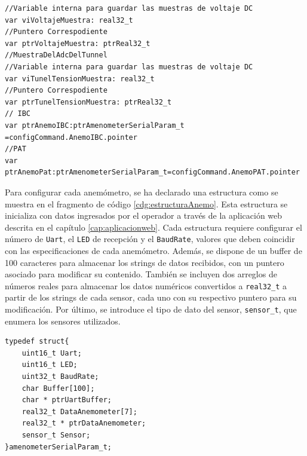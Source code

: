 \begin{lstlisting}[style=yakindustyle, caption={Variables para almacenar en cada iteración una muestra de su magnitud correspondiente.}, label=cdg:var_const_Adquisition]
//Variable interna para guardar las muestras de voltaje DC
var viVoltajeMuestra: real32_t
//Puntero Correspodiente
var ptrVoltajeMuestra: ptrReal32_t
//MuestraDelAdcDelTunnel
//Variable interna para guardar las muestras de voltaje DC
var viTunelTensionMuestra: real32_t
//Puntero Correspodiente
var ptrTunelTensionMuestra: ptrReal32_t
// IBC
var ptrAnemoIBC:ptrAmenometerSerialParam_t =configCommand.AnemoIBC.pointer
//PAT
var ptrAnemoPat:ptrAmenometerSerialParam_t=configCommand.AnemoPAT.pointer

\end{lstlisting}


Para configurar cada anemómetro, se ha declarado una estructura como se muestra en el fragmento de código \ref{cdg:estructuraAnemo}. Esta estructura se inicializa con datos ingresados por el operador a través de la aplicación web descrita en el capítulo \ref{cap:aplicacionweb}. Cada estructura requiere configurar el número de \texttt{Uart}, el \texttt{LED} de recepción y el \texttt{BaudRate}, valores que deben coincidir con las especificaciones de cada anemómetro. Además, se dispone de un buffer de 100 caracteres para almacenar los strings de datos recibidos, con un puntero asociado para modificar su contenido. También se incluyen dos arreglos de números reales para almacenar los datos numéricos convertidos a \texttt{real32\_t} a partir de los strings de cada sensor, cada uno con su respectivo puntero para su modificación. Por último, se introduce el tipo de dato del sensor, \texttt{sensor\_t}, que enumera los sensores utilizados.



% 
\begin{lstlisting}[style=cstyle, caption={Estructura de datos para anemómetro.}, label=cdg:estructuraAnemo]
typedef struct{
	uint16_t Uart;
	uint16_t LED;
	uint32_t BaudRate;
	char Buffer[100];
	char * ptrUartBuffer;
	real32_t DataAnemometer[7];
	real32_t * ptrDataAnemometer;
	sensor_t Sensor;
}amenometerSerialParam_t;
\end{lstlisting}
 
